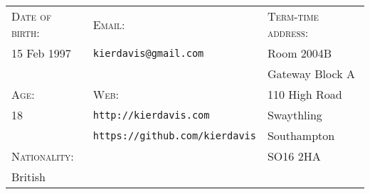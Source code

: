 \hrulefill
\vspace{1.1em}

{
\newcommand{\h}[1]{\textsc{#1}:}
\newcommand{\n}[1]{\hspace{.8em} #1}
\begin{tabu} to \textwidth {X[1,l] X[2,l] X[1.5,l]}
    \h{Date of birth}  & \h{Email}                                 & \h{Term-time address} \\
    \n{15 Feb 1997}    & \n{\texttt{kierdavis@gmail.com}}          & \n{Room 2004B}        \\
                       &                                           & \n{Gateway Block A}   \\
    \h{Age}            & \h{Web}                                   & \n{110 High Road}     \\
    \n{18}             & \n{\texttt{http://kierdavis.com}}         & \n{Swaythling}        \\
                       & \n{\texttt{https://github.com/kierdavis}} & \n{Southampton}       \\
    \h{Nationality}    &                                           & \n{SO16 2HA}          \\
    \n{British}        &                                           &                       \\
\end{tabu}
}

\hrulefill
